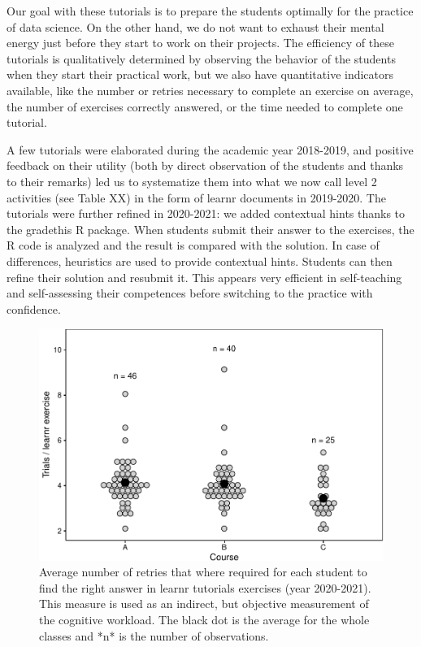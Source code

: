 \documentclass{aims}
\theoremstyle{definition}
\begin{document}
Our goal with these tutorials is to prepare the students optimally for
the practice of data science. On the other hand, we do not want to
exhaust their mental energy just before they start to work on their
projects. The efficiency of these tutorials is qualitatively determined
by observing the behavior of the students when they start their
practical work, but we also have quantitative indicators available, like
the number or retries necessary to complete an exercise on average, the
number of exercises correctly answered, or the time needed to complete
one tutorial.

A few tutorials were elaborated during the academic year 2018-2019, and
positive feedback on their utility (both by direct observation of the
students and thanks to their remarks) led us to systematize them into
what we now call level 2 activities (see Table XX) in the form of learnr
documents in 2019-2020. The tutorials were further refined in 2020-2021:
we added contextual hints thanks to the gradethis R package. When
students submit their answer to the exercises, the R code is analyzed
and the result is compared with the solution. In case of differences,
heuristics are used to provide contextual hints. Students can then
refine their solution and resubmit it. This appears very efficient in
self-teaching and self-assessing their competences before switching to
the practice with confidence.

\begin{figure}
\includegraphics[width=1\linewidth]{teaching_data_science_files/figure-latex/fig_learn_trials-1} \caption{\label{fig:fig_learn_trials} Average number of retries that where required for each student to find the right answer in learnr tutorials exercises (year 2020-2021). This measure is used as an indirect, but objective measurement of the cognitive workload. The black dot is the average for the whole classes and *n* is the number of observations.}\label{fig:fig_learn_trials}
\end{figure}
\end{document}
